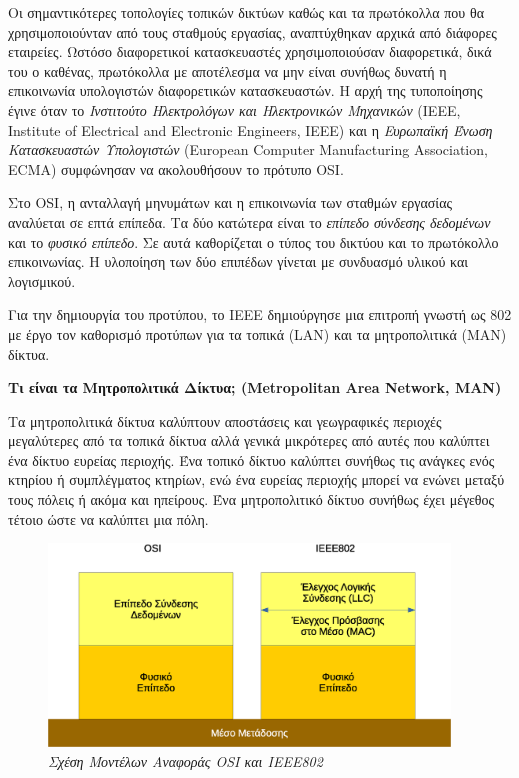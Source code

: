 Οι σημαντικότερες τοπολογίες τοπικών δικτύων καθώς και τα πρωτόκολλα που θα χρησιμοποιούνταν από τους σταθμούς εργασίας, αναπτύχθηκαν αρχικά από διάφορες εταιρείες. Ωστόσο διαφορετικοί κατασκευαστές χρησιμοποιούσαν διαφορετικά, δικά του ο καθένας, πρωτόκολλα με αποτέλεσμα να μην είναι συνήθως δυνατή η επικοινωνία υπολογιστών διαφορετικών κατασκευαστών. Η αρχή της τυποποίησης έγινε όταν το \emph{Ινστιτούτο Ηλεκτρολόγων και Ηλεκτρονικών Μηχανικών} (IEEE, Institute of Electrical and Electronic Engineers, IEEE) και η \emph{Ευρωπαϊκή Ένωση Κατασκευαστών Υπολογιστών} (European Computer Manufacturing Association, ECMA) συμφώνησαν να ακολουθήσουν το πρότυπο OSI. 

Στο OSI, η ανταλλαγή μηνυμάτων και η επικοινωνία των σταθμών εργασίας αναλύεται σε επτά επίπεδα. Τα δύο κατώτερα είναι το \emph{επίπεδο σύνδεσης δεδομένων} και το \emph{φυσικό επίπεδο}. Σε αυτά καθορίζεται ο τύπος του δικτύου και το πρωτόκολλο επικοινωνίας. Η υλοποίηση των δύο επιπέδων γίνεται με συνδυασμό υλικού και λογισμικού.

Για την δημιουργία του προτύπου, το IEEE δημιούργησε μια επιτροπή γνωστή ως 802 με έργο τον καθορισμό προτύπων για τα τοπικά (LAN) και τα μητροπολιτικά (ΜΑΝ) δίκτυα. 

\begin{inthebox}
\textbf{Τι είναι τα Μητροπολιτικά Δίκτυα; (Metropolitan Area Network, MAN)}

Τα μητροπολιτικά δίκτυα καλύπτουν αποστάσεις και γεωγραφικές περιοχές μεγαλύτερες από τα τοπικά δίκτυα αλλά γενικά μικρότερες από αυτές που καλύπτει ένα δίκτυο ευρείας περιοχής. Ένα τοπικό δίκτυο καλύπτει συνήθως τις ανάγκες ενός κτηρίου ή συμπλέγματος κτηρίων, ενώ ένα ευρείας περιοχής μπορεί να ενώνει μεταξύ τους πόλεις ή ακόμα και ηπείρους. Ένα μητροπολιτικό δίκτυο συνήθως έχει μέγεθος τέτοιο ώστε να καλύπτει μια πόλη.\\
\end{inthebox}

\begin{figure}[!ht]
  \centering
  \includegraphics[width=0.95\textwidth]{images/chapter2/2-2}
  \caption {\textsl{Σχέση Μοντέλων Αναφοράς OSI και IEEE802}}
  \label{2-2}
\end{figure}

